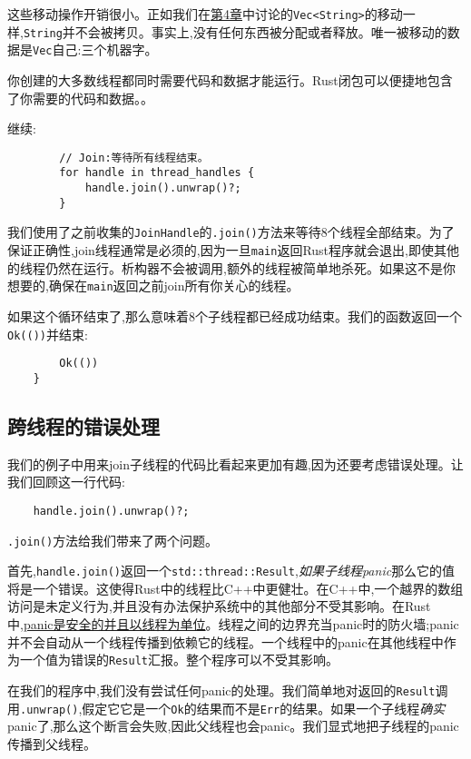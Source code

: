 这些移动操作开销很小。正如我们在\hyperref[ch04]{第4章}中讨论的\texttt{Vec<String>}的移动一样,\texttt{String}并不会被拷贝。事实上,没有任何东西被分配或者释放。唯一被移动的数据是\texttt{Vec}自己:三个机器字。

你创建的大多数线程都同时需要代码和数据才能运行。Rust闭包可以便捷地包含了你需要的代码和数据。。

继续:
\begin{verbatim}
        // Join:等待所有线程结束。
        for handle in thread_handles {
            handle.join().unwrap()?;
        }
\end{verbatim}

我们使用了之前收集的\texttt{JoinHandle}的\texttt{.join()}方法来等待8个线程全部结束。为了保证正确性,join线程通常是必须的,因为一旦\texttt{main}返回Rust程序就会退出,即使其他的线程仍然在运行。析构器不会被调用,额外的线程被简单地杀死。如果这不是你想要的,确保在\texttt{main}返回之前join所有你关心的线程。

如果这个循环结束了,那么意味着8个子线程都已经成功结束。我们的函数返回一个\texttt{Ok(())}并结束:
\begin{verbatim}
        Ok(())
    }
\end{verbatim}

\subsection{跨线程的错误处理}
我们的例子中用来join子线程的代码比看起来更加有趣,因为还要考虑错误处理。让我们回顾这一行代码:
\begin{verbatim}
    handle.join().unwrap()?;
\end{verbatim}

\texttt{.join()}方法给我们带来了两个问题。

首先,\texttt{handle.join()}返回一个\texttt{std::thread::Result},\emph{如果子线程panic}那么它的值将是一个错误。这使得Rust中的线程比C++中更健壮。在C++中,一个越界的数组访问是未定义行为,并且没有办法保护系统中的其他部分不受其影响。在Rust中,\hyperref[unwind]{panic是安全的并且以线程为单位}。线程之间的边界充当panic时的防火墙;panic并不会自动从一个线程传播到依赖它的线程。一个线程中的panic在其他线程中作为一个值为错误的\texttt{Result}汇报。整个程序可以不受其影响。

在我们的程序中,我们没有尝试任何panic的处理。我们简单地对返回的\texttt{Result}调用\texttt{.unwrap()},假定它它是一个\texttt{Ok}的结果而不是\texttt{Err}的结果。如果一个子线程\emph{确实}panic了,那么这个断言会失败,因此父线程也会panic。我们显式地把子线程的panic传播到父线程。

